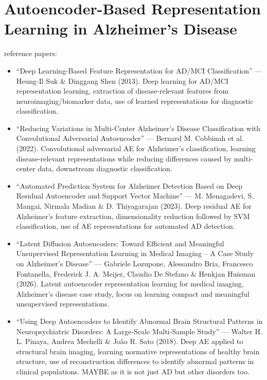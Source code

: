 \section{Autoencoder-Based Representation Learning in Alzheimer's Disease}

reference papers:
\begin{itemize}
    \item “Deep Learning-Based Feature Representation for AD/MCI Classification” — Heung-Il Suk \& Dinggang Shen (2013). Deep learning for AD/MCI representation learning, extraction of disease-relevant features from neuroimaging/biomarker data, use of learned representations for diagnostic classification.
    \item “Reducing Variations in Multi-Center Alzheimer's Disease Classification with Convolutional Adversarial Autoencoder” — Bernard M. Cobbinah et al. (2022). Convolutional adversarial AE for Alzheimer's classification, learning disease-relevant representations while reducing differences caused by multi-center data, downstream diagnostic classification.
    \item “Automated Prediction System for Alzheimer Detection Based on Deep Residual Autoencoder and Support Vector Machine” — M. Menagadevi, S. Mangai, Nirmala Madian \& D. Thiyagarajan (2023). Deep residual AE for Alzheimer's feature extraction, dimensionality reduction followed by SVM classification, use of AE representations for automated AD detection.
    \item “Latent Diffusion Autoencoders: Toward Efficient and Meaningful Unsupervised Representation Learning in Medical Imaging – A Case Study on Alzheimer's Disease” — Gabriele Lozupone, Alessandro Bria, Francesco Fontanella, Frederick J. A. Meijer, Claudio De Stefano \& Henkjan Huisman (2026). Latent autoencoder representation learning for medical imaging, Alzheimer's disease case study, focus on learning compact and meaningful unsupervised representations.
    \item “Using Deep Autoencoders to Identify Abnormal Brain Structural Patterns in Neuropsychiatric Disorders: A Large-Scale Multi-Sample Study” — Walter H. L. Pinaya, Andrea Mechelli \& João R. Sato (2018). Deep AE applied to structural brain imaging, learning normative representations of healthy brain structure, use of reconstruction differences to identify abnormal patterns in clinical populations. MAYBE as it is not just AD but other disorders too.
\end{itemize}
